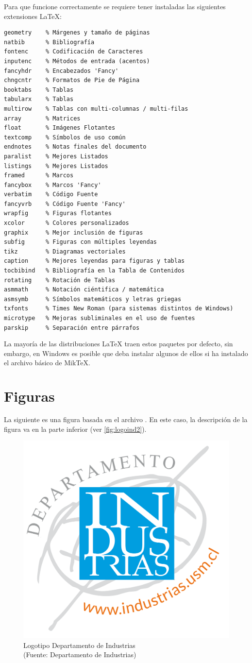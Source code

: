 Para que funcione correctamente se requiere tener instaladas las siguientes extensiones \LaTeX{}:
\begin{Verbatim}[frame=lines, label=Paquetes requeridos por \inlinecode{/memoriaUSM.sty}
				, fontsize=\footnotesize
				, baselinestretch=1
				, formatcom=\color{gray}]
geometry    % Márgenes y tamaño de páginas
natbib      % Bibliografía
fontenc     % Codificación de Caracteres
inputenc    % Métodos de entrada (acentos)
fancyhdr    % Encabezados 'Fancy'
chngcntr    % Formatos de Pie de Página
booktabs    % Tablas
tabularx    % Tablas
multirow    % Tablas con multi-columnas / multi-filas
array       % Matrices
float       % Imágenes Flotantes
textcomp    % Símbolos de uso común
endnotes    % Notas finales del documento
paralist    % Mejores Listados
listings    % Mejores Listados
framed      % Marcos
fancybox    % Marcos 'Fancy'
verbatim    % Código Fuente
fancyvrb    % Código Fuente 'Fancy'
wrapfig     % Figuras flotantes
xcolor      % Colores personalizados
graphix     % Mejor inclusión de figuras
subfig      % Figuras con múltiples leyendas
tikz        % Diagramas vectoriales
caption     % Mejores leyendas para figuras y tablas
tocbibind   % Bibliografía en la Tabla de Contenidos
rotating    % Rotación de Tablas
asmmath     % Notación ciéntifica / matemática
asmsymb     % Símbolos matemáticos y letras griegas
txfonts     % Times New Roman (para sistemas distintos de Windows)
microtype   % Mejoras subliminales en el uso de fuentes
parskip     % Separación entre párrafos
\end{Verbatim}

La mayoría de las distribuciones \LaTeX{} traen estos paquetes por defecto, sin embargo, en Windows es posible que deba instalar algunos de ellos si ha instalado el archivo básico de MikTeX.

\section{Figuras}
La siguiente es una figura basada en el archivo . En este caso, la descripción de la figura va en la parte inferior (ver \autoref{fig:logoind2}).

\begin{figure}[ht!]
\centering
\includegraphics[width=.4\textwidth]{figures/logoind.png}
\caption[Logotipo Departamento de Industrias]{Logotipo Departamento de Industrias\\
{\scriptsize (Fuente: Departamento de Industrias)}}
\label{fig:logoind2}
\end{figure}

